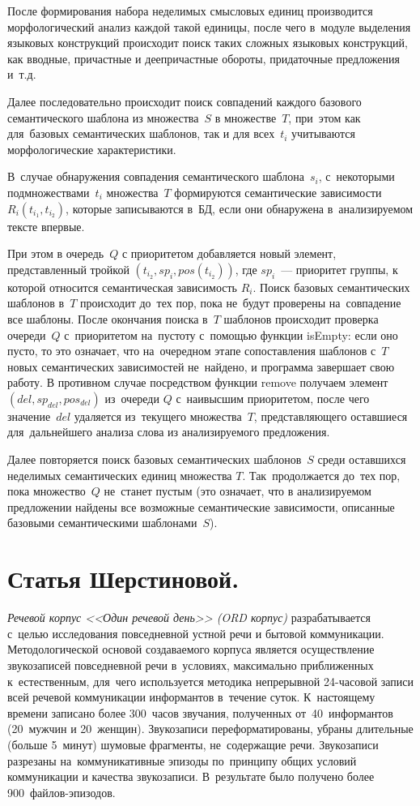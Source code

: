 \documentclass[12pt]{article}
\theoremstyle{definition}
\theoremstyle{remark}
\numberwithin{equation}{section}
\begin{document}
После формирования набора неделимых смысловых единиц производится
морфологический анализ каждой такой единицы, после чего в~модуле
выделения языковых конструкций происходит поиск таких сложных
языковых конструкций, как вводные, причастные и деепричастные
обороты, придаточные предложения и~т.д.

Далее последовательно происходит поиск совпадений каждого базового
семантического шаблона из множества~$S$ в множестве~$T$, при~этом
как для~базовых семантических шаблонов, так и для всех~$t_i$
учитываются морфологические характеристики.

В~случае обнаружения совпадения семантического шаблона~$s_i$,
с~некоторыми подмножествами~$t_i$ множества~$T$ формируются
семантические зависимости $R_i(t_{i_1}, t_{i_2})$, которые
записываются в~БД, если они обнаружена в~анализируемом тексте
впервые.

При этом в очередь~$Q$ с приоритетом  добавляется новый элемент,
представленный тройкой $(t_{i_2}, sp_i, pos(t_{i_2}))$, где $sp_i$~---
приоритет группы, к которой относится семантическая зависимость $R_i$.
Поиск базовых семантических шаблонов в~$T$ происходит до~тех пор,
пока не~будут проверены на~совпадение все шаблоны. После окончания
поиска в~$T$ шаблонов происходит проверка очереди~$Q$ с~приоритетом
на~пустоту с~помощью функции isEmpty: если оно пусто, то это
означает, что на~очередном этапе сопоставления шаблонов с~$T$
новых семантических зависимостей не~найдено, и программа завершает
свою работу. В противном случае посредством функции remove
получаем элемент $(del,sp_{del}, pos_{del})$ из~очереди $Q$
с~наивысшим приоритетом, после чего значение~$del$ удаляется
из~текущего множества~$T$, представляющего оставшиеся
для~дальнейшего анализа слова из анализируемого предложения.

Далее повторяется поиск базовых семантических шаблонов~$S$
среди оставшихся неделимых семантических единиц множества $T$.
Так~продолжается до~тех пор, пока множество~$Q$ не~станет
пустым (это означает, что в анализируемом предложении найдены
все возможные семантические зависимости, описанные базовыми
семантическими шаблонами~$S$).

\section{Статья Шерстиновой.}
\textsl{Речевой корпус <<Один речевой день>> (ORD корпус)}
разрабатывается с~целью исследования повседневной устной речи
и бытовой коммуникации. Методологической основой создаваемого
корпуса является осуществление звукозаписей повседневной речи
в~условиях, максимально приближенных к~естественным, для~чего
используется методика непрерывной 24\nobreakdash-часовой записи
всей речевой коммуникации информантов в~течение суток.
К~настоящему времени записано более 300~часов звучания,
полученных от~40~информантов (20~мужчин и 20~женщин). Звукозаписи
переформатированы, убраны длительные (больше 5~минут) шумовые
фрагменты, не~содержащие речи. Звукозаписи разрезаны
на~коммуникативные эпизоды по~принципу общих условий коммуникации
и качества звукозаписи. В~результате было получено более
900~файлов-эпизодов.
\end{document}
